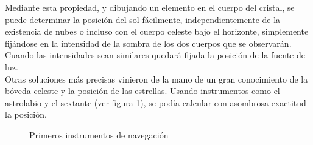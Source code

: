 Mediante esta propiedad, y dibujando un elemento en el cuerpo del cristal, se puede determinar la posición del sol fácilmente, independientemente de la existencia de nubes o incluso con el cuerpo celeste bajo el horizonte, simplemente fijándose en la intensidad de la sombra de los dos cuerpos que se observarán. Cuando las intensidades sean similares quedará fijada la posición de la fuente de luz.\\


Otras soluciones más precisas vinieron de la mano de un gran conocimiento de la bóveda celeste y la posición de las estrellas. Usando instrumentos como el astrolabio y el sextante (ver figura \ref{fig:sextante_astrolabio}), se podía calcular con asombrosa exactitud la posición.

\begin{figure}[h!btp]
	\begin{adjustbox}{minipage=\linewidth, fbox}
		\centering
		\hspace{10mm}
	\end{adjustbox}
	\caption{Primeros instrumentos de navegación}
	\label{fig:sextante_astrolabio}
\end{figure}

